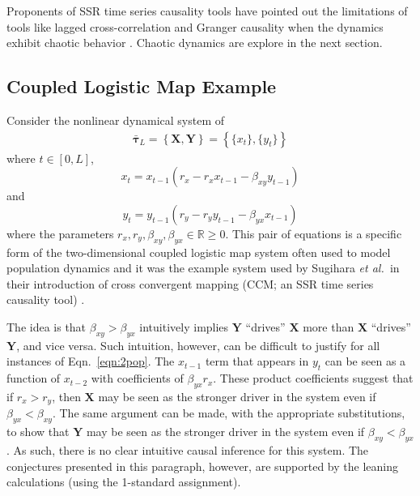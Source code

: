 \documentclass[a4paper,11pt,twocolumn]{article}
\begin{document}
Proponents of SSR time series causality tools have pointed out the limitations of tools like lagged cross-correlation and Granger causality when the dynamics exhibit chaotic behavior \cite{Sugihara}.  Chaotic dynamics are explore in the next section.

\subsection{Coupled Logistic Map Example}
\label{sec:2Pop}
Consider the nonlinear dynamical system of
\begin{eqnarray}
\label{eqn:2pop}
\bar{\mathbf{\tau}}_L = \left\{\mathbf{X},\mathbf{Y}\right\} = \left\{\{x_t\},\{y_t\}\right\}
\end{eqnarray}
where $t\in[0,L]$,
\begin{equation*}
x_t = x_{t-1}\left(r_x-r_x x_{t-1}-\beta_{xy} y_{t-1}\right)
\end{equation*}
and
\begin{equation*}
y_t = y_{t-1}\left(r_y-r_y y_{t-1}-\beta_{yx} x_{t-1}\right)
\end{equation*}
where the parameters $r_x,r_y,\beta_{xy},\beta_{yx}\in\mathbb{R}\ge 0$.  This pair of equations is a specific form of the two-dimensional coupled logistic map system often used to model population dynamics \cite{Lloyd1995} and it was the example system used by Sugihara {\em et al.\ }in their introduction of cross convergent mapping (CCM; an SSR time series causality tool) \cite{Sugihara2012}.

The idea is that $\beta_{xy}>\beta_{yx}$ intuitively implies $\mathbf{Y}$ ``drives'' $\mathbf{X}$ more than $\mathbf{X}$ ``drives'' $\mathbf{Y}$, and vice versa.  Such intuition, however, can be difficult to justify for all instances of Eqn.\ \ref{eqn:2pop}.  The $x_{t-1}$ term that appears in $y_t$ can be seen as a function of $x_{t-2}$ with coefficients of $\beta_{yx}r_x$.  These product coefficients suggest that if $r_x>r_y$, then $\mathbf{X}$ may be seen as the stronger driver in the system even if $\beta_{yx}<\beta_{xy}$.  The same argument can be made, with the appropriate substitutions, to show that $\mathbf{Y}$ may be seen as the stronger driver in the system even if $\beta_{xy}<\beta_{yx}$.  As such, there is no clear intuitive causal inference for this system.  The conjectures presented in this paragraph, however, are supported by the leaning calculations (using the 1-standard assignment).
\end{document}
